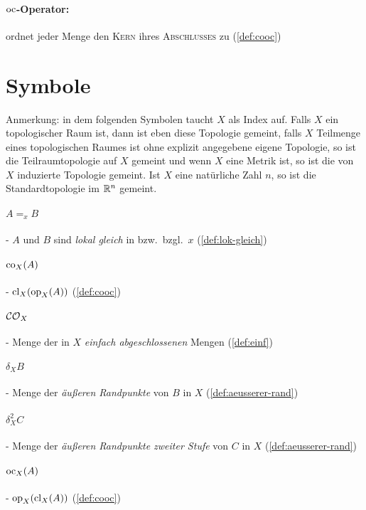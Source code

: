     \paragraph{$\text{oc}$-Operator:} ordnet jeder Menge den \textsc{Kern} ihres \textsc{Abschlusses} zu (\ref{def:cooc})
    
   
\section*{Symbole}

    Anmerkung: in dem folgenden Symbolen taucht $X$ als Index auf. Falls $X$ ein topologischer Raum ist, dann ist eben diese Topologie gemeint, falls $X$ Teilmenge eines topologischen Raumes ist ohne explizit angegebene eigene Topologie, so ist die Teilraumtopologie auf $X$ gemeint und wenn $X$ eine Metrik ist, so ist die von $X$ induzierte Topologie gemeint. Ist $X$ eine natürliche Zahl $n$, so ist die Standardtopologie im $\mathbb{R}^n$ gemeint.

    \paragraph{$A =_x B$} - \quad $A$ und $B$ sind \textit{lokal gleich} in bzw.\ bzgl.\ $x$  (\ref{def:lok-gleich})

    \paragraph{$\text{co}_X(A)$} - \quad $\text{cl}_X(\text{op}_X(A))$ (\ref{def:cooc})

    \paragraph{$\mathcal{CO}_X$} - \quad Menge der in $X$ \textit{einfach abgeschlossenen} Mengen (\ref{def:einf})

    \paragraph{$\delta_X B$} - \quad Menge der \textit{äußeren Randpunkte} von $B$ in $X$ (\ref{def:aeusserer-rand})
    
    \paragraph{$\delta_X^2 C$} - \quad Menge der \textit{äußeren Randpunkte zweiter Stufe} von $C$ in $X$ (\ref{def:aeusserer-rand})

    \paragraph{$\text{oc}_X(A)$} - \quad $\text{op}_X(\text{cl}_X(A))$ (\ref{def:cooc})

